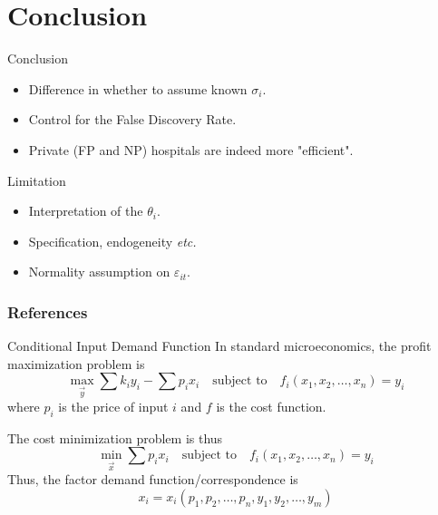 \documentclass[10pt,mathserif,aspectratio=169]{beamer}
\begin{document}
\section{Conclusion}

\begin{frame}{Conclusion}
  \begin{itemize}
    \item Difference in whether to assume known $\sigma_i$.
    \item Control for the False Discovery Rate.
    \item Private (FP and NP) hospitals are indeed more "efficient".
  \end{itemize}
\end{frame}

\begin{frame}[label=limitation]{Limitation}
  \begin{itemize}\itemsep=12pt
    \item Interpretation of the $\theta_i$.
    \item Specification, endogeneity \textit{etc.}
    \item Normality assumption on $\varepsilon_{it}$.
          \hyperlink{normality}{}
  \end{itemize}
\end{frame}

\begin{frame}[allowframebreaks]
  \frametitle{References}
  
  
\end{frame}

\appendix

\begin{frame}[label=inputdemand]{Conditional Input Demand Function}
  In standard microeconomics, the profit maximization problem is
  \begin{equation*}
    \max_{\vec{y}} \sum k_i y_i - \sum p_i x_i \quad \text{subject to} \quad f_i(x_1, x_2, \ldots, x_n) = y_i
  \end{equation*}
  where $p_i$ is the price of input $i$ and $f$ is the cost function.

  The cost minimization problem is thus
  \begin{equation*}
    \min_{\vec{x}} \sum p_i x_i \quad \text{subject to} \quad f_i(x_1, x_2, \ldots, x_n) = y_i
  \end{equation*}
  Thus, the factor demand function/correspondence is
  \begin{equation*}
    x_i = x_i(p_1, p_2, \ldots, p_n, y_1, y_2, \ldots, y_m)
  \end{equation*}

\end{frame}
\end{document}
